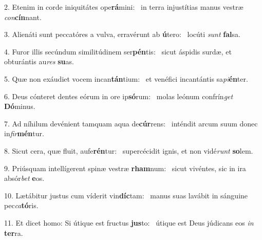 2. Etenim in corde iniquitátes ope\textbf{rá}mini: \ast\  in terra injustítias manus vestræ \textit{con}\textbf{cín}nant.\

3. Alienáti sunt peccatóres a vulva, erravérunt ab \textbf{ú}tero: \ast\  locúti \textit{sunt} \textbf{fal}sa.\

4. Furor illis secúndum similitúdinem ser\textbf{pén}tis: \ast\  sicut áspidis surdæ, et obturántis au\textit{res} \textbf{su}as.\

5. Quæ non exáudiet vocem incan\textbf{tán}tium: \ast\  et venéfici incantántis sa\textit{pi}\textbf{én}ter.\

6. Deus cónteret dentes eórum in ore ip\textbf{só}rum: \ast\  molas leónum confrín\textit{get} \textbf{Dó}minus.\

7. Ad níhilum devénient tamquam aqua de\textbf{cúr}rens: \ast\  inténdit arcum suum donec in\textit{fir}\textbf{mén}tur.\

8. Sicut cera, quæ fluit, aufe\textbf{rén}tur: \ast\  supercécidit ignis, et non vidé\textit{runt} \textbf{so}lem.\

9. Priúsquam intellígerent spinæ vestræ \textbf{rham}num: \ast\  sicut vivéntes, sic in ira absór\textit{bet} \textbf{e}os.\

10. Lætábitur justus cum víderit vin\textbf{díc}tam: \ast\  manus suas lavábit in sánguine pec\textit{ca}\textbf{tó}ris.\

11. Et dicet homo: Si útique est fructus \textbf{jus}to: \ast\  útique est Deus júdicans eos \textit{in} \textbf{ter}ra.\

